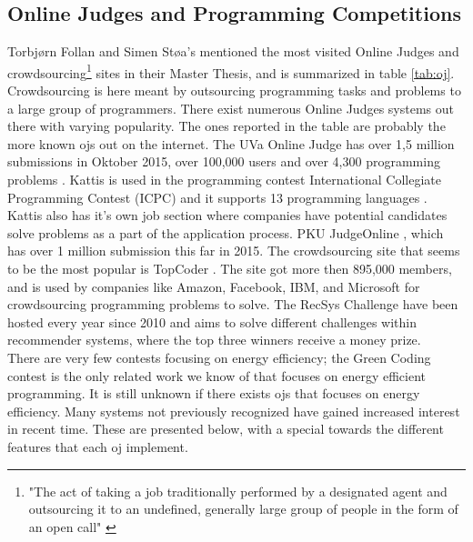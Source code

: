 \subsection{Online Judges and Programming Competitions}
Torbjørn Follan and Simen Støa's mentioned the most visited Online Judges and crowdsourcing\footnote{"The act of taking a job traditionally performed by a designated agent and outsourcing it to an undefined, generally large group of people in the form of an open call" \cite{m:cs}} sites in their Master Thesis, and is summarized in table \ref{tab:oj}. Crowdsourcing is here meant by outsourcing programming tasks and problems to a large group of programmers. There exist numerous Online Judges systems out there with varying popularity. The ones reported in the table are probably the more known \gls{ojs} out on the internet. The UVa Online Judge has over 1,5 million submissions in Oktober 2015, over 100,000 users and over 4,300 programming problems \cite{m:UVa}. Kattis is used in the programming contest International Collegiate Programming Contest (ICPC) and it supports 13 programming languages \cite{m:Kat}. Kattis also has it's own job section where companies have potential candidates solve problems as a part of the application process. PKU JudgeOnline \cite{m:PKU}, which has over 1 million submission this far in 2015. The crowdsourcing site that seems to be the most popular is TopCoder \cite{m:topcoder}. The site got more then 895,000 members, and is used by companies like Amazon, Facebook, IBM, and Microsoft for crowdsourcing programming problems to solve. The RecSys Challenge \cite{m:recsys} have been hosted every year since 2010 and aims to solve different challenges within recommender systems, where the top three winners receive a money prize. \\

There are very few contests focusing on energy efficiency; the Green Coding contest is the only related work we know of that focuses on energy efficient programming. It is still unknown if there exists \gls{ojs} that focuses on energy efficiency. Many systems not previously recognized have gained increased interest in recent time. These are presented below, with a special towards the different features that each \gls{oj} implement. \\


